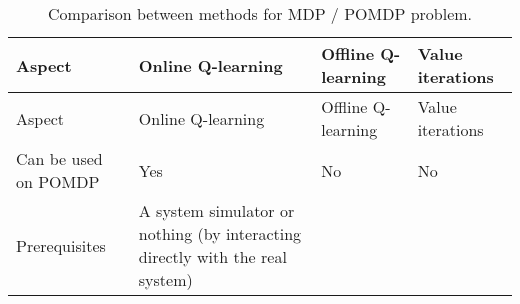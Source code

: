 \documentclass[
  a4paper, xcolor = usenames,dvipsnames]{article}
\theoremstyle{definition}
\theoremstyle{definition}
\theoremstyle{definition}
\theoremstyle{definition}
\theoremstyle{remark}
\begin{document}
\begin{longtable}[]{@{}llll@{}}
\caption{Comparison between methods for MDP / POMDP problem.}\tabularnewline
\toprule
\begin{minipage}[b]{0.18\columnwidth}\raggedright
Aspect\strut
\end{minipage} & \begin{minipage}[b]{0.35\columnwidth}\raggedright
Online Q-learning\strut
\end{minipage} & \begin{minipage}[b]{0.18\columnwidth}\raggedright
Offline Q-learning\strut
\end{minipage} & \begin{minipage}[b]{0.18\columnwidth}\raggedright
Value iterations\strut
\end{minipage}\tabularnewline
\midrule
\endfirsthead
\toprule
\begin{minipage}[b]{0.18\columnwidth}\raggedright
Aspect\strut
\end{minipage} & \begin{minipage}[b]{0.35\columnwidth}\raggedright
Online Q-learning\strut
\end{minipage} & \begin{minipage}[b]{0.18\columnwidth}\raggedright
Offline Q-learning\strut
\end{minipage} & \begin{minipage}[b]{0.18\columnwidth}\raggedright
Value iterations\strut
\end{minipage}\tabularnewline
\midrule
\endhead
\begin{minipage}[t]{0.18\columnwidth}\raggedright
Can be used on POMDP\strut
\end{minipage} & \begin{minipage}[t]{0.35\columnwidth}\raggedright
Yes\strut
\end{minipage} & \begin{minipage}[t]{0.18\columnwidth}\raggedright
No\strut
\end{minipage} & \begin{minipage}[t]{0.18\columnwidth}\raggedright
No\strut
\end{minipage}\tabularnewline
\begin{minipage}[t]{0.18\columnwidth}\raggedright
Prerequisites\strut
\end{minipage} & \begin{minipage}[t]{0.35\columnwidth}\raggedright
A system simulator or nothing (by interacting directly with the real system)\strut
\end{minipage} & \begin{minipage}[t]{0.18\columnwidth}\raggedright

\end{minipage}
\end{longtable}
\end{document}

